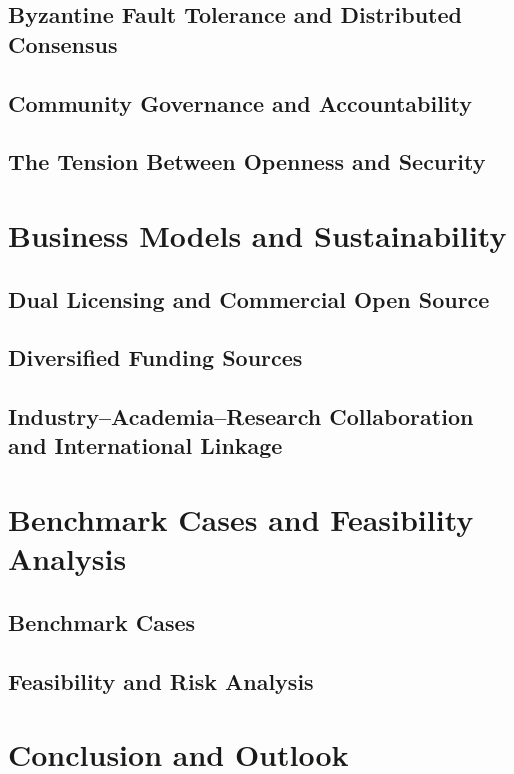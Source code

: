 \documentclass[11pt]{article}
\begin{document}
\subsection{Byzantine Fault Tolerance and Distributed Consensus}
\subsection{Community Governance and Accountability}
\subsection{The Tension Between Openness and Security}

\section{Business Models and Sustainability}
\subsection{Dual Licensing and Commercial Open Source}
\subsection{Diversified Funding Sources}
\subsection{Industry--Academia--Research Collaboration and International Linkage}

\section{Benchmark Cases and Feasibility Analysis}
\subsection{Benchmark Cases}
\subsection{Feasibility and Risk Analysis}

\section{Conclusion and Outlook}



\end{document}
